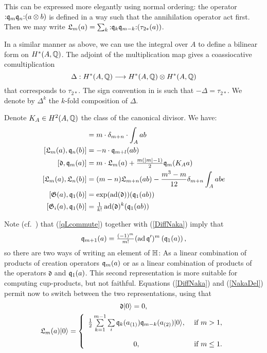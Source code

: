 \begin{remark}
This can be expressed more elegantly using normal ordering: the operator $\mathop{:}\nolimits\!\mathfrak{q}_m\mathfrak{q}_n\!\mathop{:}\nolimits(a\otimes b)$ is defined in a way such that the annihilation operator act first. Then we may write $\mathfrak{L}_m(a) = \sum_k
\mathop{:}\nolimits\! \mathfrak{q}_k \mathfrak{q}_{m-k} \!\mathop{:}\nolimits (\tau_{2*}(a))$.
\end{remark}
\begin{remark}
In a similar manner as above, we can use the integral over $A$ to define a bilinear form on $H^*(A,\mathbb{Q})$. The adjoint of the multiplication map gives a coassiocative comultiplication
$$
\Delta : H^*(A,\mathbb{Q}) \longrightarrow H^*(A,\mathbb{Q})\otimes H^*(A,\mathbb{Q})
$$
that corresponds to $\tau_{2*}$. The sign convention in \cite{LehnSorger} is such that $-\Delta =  \tau_{2*}$. We denote by $\Delta^k$ the $k$-fold composition of $\Delta$.
\end{remark}
\begin{lemma}\cite[Thm.~2.16]{LiQinWang} Denote $K_A\in H^2(A,\mathbb{Q})$ the class of the canonical divisor. We have:
\label{commutators}
\begin{align}
[\q_m(a), \q_n(b)] &= m\cdot \delta_{m+n} \cdot \int_A ab \\
\label{qLcommute}
[\mathfrak{L}_m(a),\q_n(b)] &= -n\cdot \q_{m+l}(ab) \\
\label{DiffNaka}
[\mathfrak{d},\q_m(a)] &= m \cdot \mathfrak{L}_m(a) + \tfrac{m(|m|-1)}{2} \q_m(K_A a) \\
[\mathfrak{L}_m(a),\mathfrak{L}_n(b)] &= (m-n) \mathfrak{L}_{m+n}(ab) - \frac{m^3-m}{12} \delta_{m+n}\int_A abe \\
[\G(a),\q_1(b)] &= \exp(\ad(\mathfrak{d}))(\q_1(a b) ) \\
[\G_i(a),\q_1(b)] &= \tfrac{1}{k!} \ad(\mathfrak{d})^k(\q_1(a b) ) 
\end{align}
\end{lemma}
\begin{remark}\label{HRep}
Note (cf.~\cite[Thm.~3.8]{LehnSorger}) that (\ref{qLcommute}) together with (\ref{DiffNaka}) imply that 
\begin{equation}\label{NakaDel}
\mathfrak{q}_{m+1}(a) = \tfrac{(-1)^m}{m!}(\operatorname{ad}\mathfrak{q}')^m\left(\mathfrak{q}_1(a)\right),
\end{equation}
so there are two ways of writing an element of $\mathbb{H}$: As a linear combination of products of creation operators $\mathfrak{q}_m(a)$ or as a linear combination of products of the operators $\mathfrak{d}$ and $\mathfrak{q}_1(a)$. This second representation is more suitable for computing cup-products, but not faithful. 
Equations (\ref{DiffNaka}) and (\ref{NakaDel}) permit now to switch between the two representations, using that
\begin{gather}
\mathfrak{d} \vac = 0 ,  \\
\mathfrak{L}_m(a) \vac = \left\{ 
\begin{array}{cl}
 \tfrac{1}{2}\sum\limits_{k=1}^{m-1}\sum\limits_{i}\q_k(a_{(1)})\q_{m-k}(a_{(2)})\vac, & \text{ if } m>1, \vspace{4mm}\\
 0, & \text{ if } m\leq 1. \\
\end{array}
\right.\\
\end{gather}
\end{remark}

